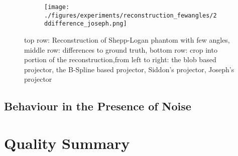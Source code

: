 \begin{figure}[h]
{{\begin{subfigure}[b]{0.3125\textwidth}
				\texttt{[image: ./figures/experiments/reconstruction\_fewangles/2ddifference\_joseph.png]}
			\end{subfigure}
		}}
	\caption{top row: Reconstruction of Shepp-Logan phantom with few angles, middle row:
		differences to ground truth, bottom row: crop into portion of the reconstruction,from left
		to right: the blob based projector, the B-Spline based projector, Siddon's projector,
		Joseph's projector}%
	\label{fig:reconstruction_fewangles}
\end{figure}

\subsection{Behaviour in the Presence of Noise}


\section{Quality Summary}\label{sec:experiments_quality_projection}

